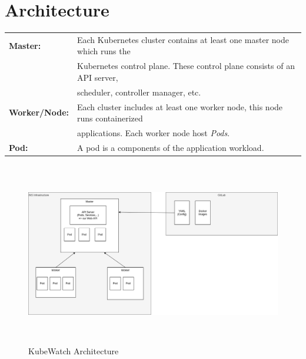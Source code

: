 \chapter{Architecture}

    

\begin{tabular}{ll}
  \textbf{Master:}        & Each Kubernetes cluster contains at least one master node which runs the \\ 
                          & Kubernetes control plane. These control plane consists of an API server, \\
                          & scheduler, controller manager, etc. \\
  \textbf{Worker/Node:}   & Each cluster includes at least one worker node, this node runs containerized \\
                          & applications. Each worker node host \textit{Pods}. \\
  \textbf{Pod:}           & A pod is a components of the application workload. \\
\end{tabular}

\begin{figure}[h]
  \centering
  \caption{KubeWatch Architecture}
  \label{fig:architecture}
  \includegraphics[height=8cm]{resources/architecture.png}
\end{figure}

